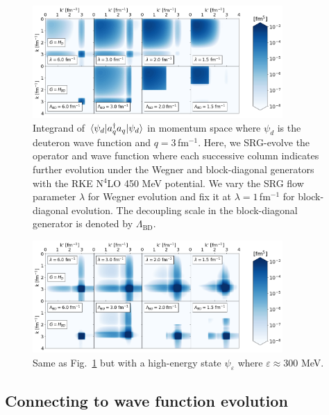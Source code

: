 \documentclass[10pt,aps,prc,floatfix,twocolumn,nofootinbib]{revtex4-1}
\newcommand{\LambdaBD}{{\Lambda_{\text{BD}}}}
\newcommand{\ataq}{a^{\dagger}_q a_q}
\begin{document}
%
\begin{figure}[tbh]
	\includegraphics[clip,width=0.85\textwidth]{momentum_projection_integrand_contours_q3,00_kvnn_111.png}%
	\caption{Integrand of $\mel{\psi_d}{\ataq}{\psi_d}$ in momentum space where $\psi_d$ is the deuteron wave function and $q=3$\,fm$^{-1}$. Here, we SRG-evolve the operator and wave function where each successive column indicates further evolution under the Wegner and block-diagonal generators with the RKE N$^4$LO 450 MeV potential. We vary the SRG flow parameter $\lambda$ for Wegner evolution and fix it at $\lambda=1$\,fm$^{-1}$ for block-diagonal evolution. The decoupling scale in the block-diagonal generator is denoted by $\LambdaBD$.}
	\label{fig:momentum_projection_integrand_contours_q3,00_RKE}
\end{figure}
%
\begin{figure}[tbh]
	\includegraphics[clip,width=0.85\textwidth]{momentum_projection_integrand_contours_q3,00_kvnn_111_eps300,0.png}%
	\caption{Same as Fig.~\ref{fig:momentum_projection_integrand_contours_q3,00_RKE} but with a high-energy state $\psi_{\varepsilon}$ where $\varepsilon \approx 300$ MeV.}
	\label{fig:momentum_projection_integrand_contours_q3,00_eps300_RKE}
\end{figure}
%

\subsection{Connecting to wave function evolution}
\label{subsec:connecting}
\end{document}
